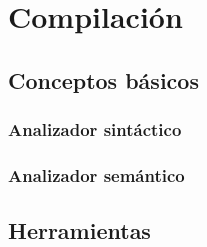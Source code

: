 \section{Compilación}\label{sec:compilacion}



\subsection{Conceptos básicos}


\subsubsection{Analizador sintáctico}

\subsubsection{Analizador semántico}

\subsection{Herramientas}
